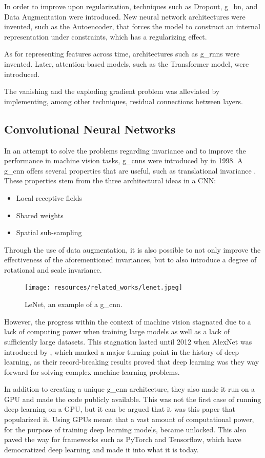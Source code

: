 In order to improve upon regularization, techniques such as Dropout\cite{dropout}, \gls*{g_bn}\cite{batchnorm}, and Data Augmentation\cite{data_augmentation} were introduced. New neural network architectures were invented, such as the Autoencoder\cite{autoencoder}, that forces the model to construct an internal representation under constraints, which has a regularizing effect.
\par
As for representing features across time, architectures such as \glspl*{g_rnn}\cite{lstm,gru} were invented. Later, attention\cite{attention}-based models, such as the Transformer\cite{transformer} model, were introduced.\par
The vanishing and the exploding gradient problem was alleviated by implementing, among other techniques, residual connections\cite{resnet} between layers.
\subsection{Convolutional Neural Networks}
In an attempt to solve the problems regarding invariance and to improve the performance in machine vision tasks, \glspl*{g_cnn} were introduced by \textcite{cnn} in 1998. A \gls*{g_cnn} offers several properties that are useful, such as translational invariance \cite{cnn}. These properties stem from the three architectural ideas in a CNN:
\begin{itemize}
    \item Local receptive fields
    \item Shared weights
    \item Spatial sub-sampling
\end{itemize}
Through the use of data augmentation, it is also possible to not only improve the effectiveness of the aforementioned invariances, but to also introduce a degree of rotational and scale invariance.
\begin{figure}[H]
    \centering
    \texttt{[image: resources/related\_works/lenet.jpeg]}
    \caption{LeNet\cite{cnn}, an example of a \gls*{g_cnn}.}
\end{figure}
\par
However, the progress within the context of machine vision stagnated due to a lack of computing power when training large models as well as a lack of sufficiently large datasets. This stagnation lasted until 2012 when AlexNet was introduced by \textcite{alexnet}, which marked a major turning point in the history of deep learning, as their record-breaking results proved that deep learning was they way forward for solving complex machine learning problems.
\par
In addition to creating a unique \gls*{g_cnn} architecture, they also made it run on a GPU and made the code publicly available. This was not the first case of running deep learning on a GPU\cite{deeplearning_gpu}, but it can be argued that it was this paper that popularized it.  Using GPUs meant that a vast amount of computational power, for the purpose of training deep learning models, became unlocked. This also paved the way for frameworks such as PyTorch\cite{pytorch} and Tensorflow\cite{tensorflow}, which have democratized deep learning and made it into what it is today.

